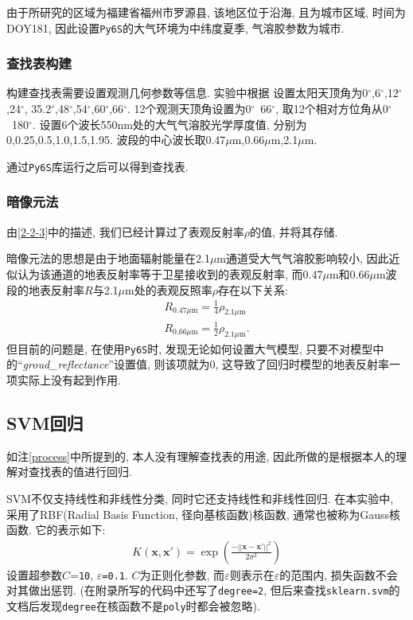 \documentclass{ctexart}
\begin{document}
\begin{sloppypar}
由于所研究的区域为福建省福州市罗源县, 该地区位于沿海, 且为城市区域,
时间为DOY181, 因此设置\verb|Py6S|的大气环境为中纬度夏季, 气溶胶参数为城市.

\subsubsection{查找表构建}
构建查找表需要设置观测几何参数等信息. 实验中根据\cite{陶金花李小英-705}
设置太阳天顶角为0$^\circ$,6$^\circ$,12$^\circ$,24$^\circ$, 35.2$^\circ$,48$^\circ$,54$^\circ$,60$^\circ$,66$^\circ$. 12个观测天顶角设置为0$^\circ$~66$^\circ$, 取12个相对方位角从0$^\circ$~180$^\circ$. 设置6个波长550nm处的大气气溶胶光学厚度值, 分别为0,0.25,0.5,1.0,1.5,1.95. 波段的中心波长取0.47$\mu$m,0.66$\mu$m,2.1$\mu$m.

通过\verb|Py6S|库运行之后可以得到查找表.

\subsubsection{暗像元法}
由\ref{2-2-3}中的描述, 我们已经计算过了表观反射率$\rho$的值, 并将其存储.

暗像元法的思想是由于地面辐射能量在2.1$\mu$m通道受大气气溶胶影响较小, 
因此近似认为该通道的地表反射率等于卫星接收到的表观反射率, 而0.47$\mu$m和0.66$\mu$m波段的地表反射率$R$与2.1$\mu$m处的表观反照率$\rho$存在以下关系\cite{李刚-706}:
\begin{align}
R_{0.47\mu\mathrm{m}}=\frac{1}{4}\rho_{2.1\mu\mathrm{m}}\\
R_{0.66\mu\mathrm{m}}=\frac{1}{2}\rho_{2.1\mu\mathrm{m}}.
\end{align}
但目前的问题是, 在使用\verb|Py6S|时, 发现无论如何设置大气模型, 只要不对模型中的``\textit{groud\_reflectance}''设置值, 则该项就为0, 这导致了回归时模型的地表反射率一项实际上没有起到作用. 

\subsection{SVM回归}
如注\ref{process}中所提到的, 本人没有理解查找表的用途, 因此所做的是根据本人的理解对查找表的值进行回归. 

SVM不仅支持线性和非线性分类, 同时它还支持线性和非线性回归\cite{Geron-710,Zhang-711}. 在本实验中, 采用了RBF(Radial Basis Function, 径向基核函数)核函数, 通常也被称为Gauss核函数. 它的表示如下\cite{Zhang-711}:
\begin{align}
K(\mathbf{x},\mathbf{x'})=\exp \left(\frac{-||\mathbf{x}-\mathbf{x'}||^2}{2\sigma^2}\right)
\end{align}
设置超参数$C$=\verb|10|, $\varepsilon$\verb|=0.1|. $C$为正则化参数, 而$\varepsilon$则表示在$\varepsilon$的范围内, 损失函数不会对其做出惩罚\cite{scikit-learn,Geron-710,Zhang-711}. 
(在附录所写的代码中还写了\verb|degree=2|, 但后来查找\verb|sklearn.svm|的文档后发现\verb|degree|在核函数不是\verb|poly|时都会被忽略).


\end{sloppypar}
\end{document}
